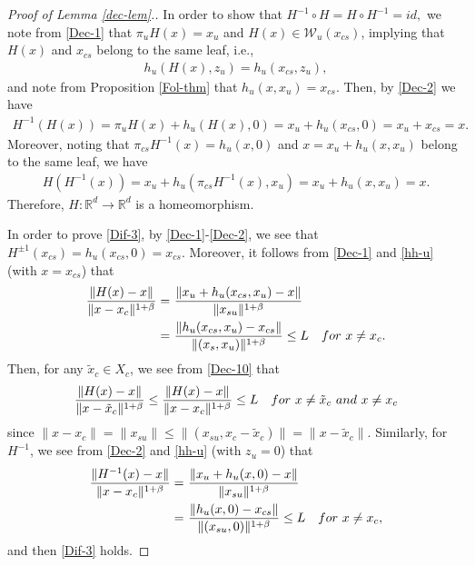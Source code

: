 \documentclass[10pt,a4paper]{amsart}
\begin{document}
\begin{proof}[Proof of Lemma {\rm \ref{dec-lem}.}]
In order to show that
$
H^{-1}\circ H=H \circ H^{-1}=id,
$
we note from \eqref{Dec-1} that
$\pi_uH(x)=x_u$ and $H(x)\in \mathcal{W}_u(x_{cs})$, implying that $H(x)$ and $x_{cs}$ belong to the same leaf, i.e.,
\begin{align}\label{huhu}
h_u(H(x),z_u)=h_u(x_{cs},z_u),
\end{align}
and note from Proposition \ref{Fol-thm} that $h_u(x,x_u)=x_{cs}$.
Then, by \eqref{Dec-2} we have
\begin{align*}
H^{-1}(H(x)) =\pi_u H(x) + h_u(H(x),0)
=x_u+h_u(x_{cs},0)=x_u+x_{cs}=x.
\end{align*}
Moreover, noting that $\pi_{cs}H^{-1}(x)=h_u(x,0)$ and $x=x_u+h_u(x,x_u)$ belong to the same leaf, we have
\begin{align*}
H(H^{-1}(x))=x_u+h_u(\pi_{cs}H^{-1}(x),x_u)=x_u+h_u(x,x_u)=x.
\end{align*}
Therefore, $H:\mathbb{R}^d\to \mathbb{R}^d$ is a homeomorphism.

In order to prove \eqref{Dif-3}, by \eqref{Dec-1}-\eqref{Dec-2}, we see that $H^{\pm 1}(x_{cs})=h_u(x_{cs},0)=x_{cs}$.
Moreover, it follows from \eqref{Dec-1} and \eqref{hh-u} (with $x=x_{cs}$) that
\begin{align}\label{Dec-10}
\frac{\|H(x)-x\|}{\|x-x_c\|^{1+\beta}}
=&~  \frac{\|x_u+h_u(x_{cs},x_u)-x\|}{\|x_{su}\|^{1+\beta}}
\notag \\
= &~ \frac{\| h_u(x_{cs},x_u)-x_{cs}\|}{\|(x_s,x_u)\|^{1+\beta}}\le L\quad {\rm for}~x\ne x_c.
\end{align}
Then, for any $\tilde{x}_c\in X_c$, we see from \eqref{Dec-10} that
\begin{align}\label{Dec-11}
\frac{\|H(x)- x\|}{\|x-\tilde{x}_c\|^{1+\beta}}
\le \frac{\|H(x)- x\|}{\|x-x_c\|^{1+\beta}}\le L\quad {\rm for}~x\ne \tilde x_c~{\rm and}~x\ne x_c
\end{align}
since $\|x-x_c\|=\|x_{su}\| \le \|(x_{su}, x_c-\tilde{x}_c)\|= \|x-\tilde{x}_c\|$.
Similarly, for $H^{-1}$, we see from \eqref{Dec-2} and \eqref{hh-u} (with $z_u=0$) that
\begin{align*}
\frac{\|H^{-1}(x)-x\|}{\|x-x_c\|^{1+\beta}}
=&~  \frac{\|x_u+h_u(x,0)-x\|}{\|x_{su}\|^{1+\beta}}
\\
=&~  \frac{\| h_u(x,0)-x_{cs}\|}{\|(x_{su},0)\|^{1+\beta}}\le L\quad {\rm for}~x\ne x_c,
\end{align*}
and then \eqref{Dif-3} holds.


\end{proof}
\end{document}
